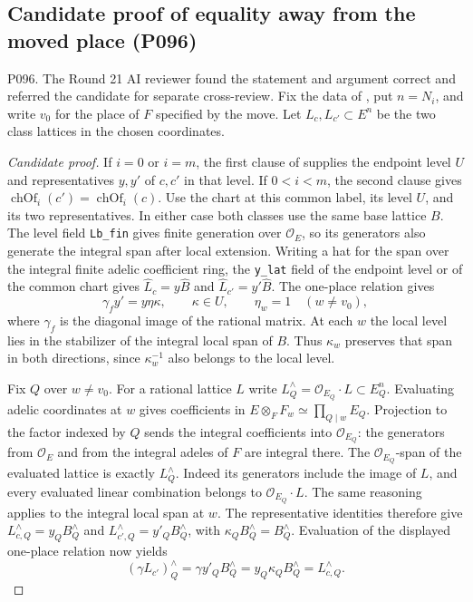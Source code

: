 \subsection{Candidate proof of equality away from the moved place (P096)}
\label{sec:pending-p096}
\noindent\textsf{P096. The Round 21 AI reviewer found the statement and argument correct and referred the candidate for separate cross-review.}
Fix the data of , put $n=N_i$, and write $v_0$ for the
place of $F$ specified by the move. Let $L_c,L_{c'}\subset E^n$ be
the two class lattices in the chosen coordinates.

\begin{proof}[Candidate proof]
If $i=0$ or $i=m$, the first clause of  supplies the
endpoint level $U$ and representatives $y,y'$ of $c,c'$ in that
level. If $0<i<m$, the second clause gives
$\operatorname{chOf}_i(c')=\operatorname{chOf}_i(c)$. Use the
chart at this common label, its level $U$, and its two representatives.
In either case both classes use the same base lattice $B$. The level
field \nolinkurl{Lb_fin} gives finite generation over $\mathcal O_E$,
so its generators also generate the integral span after local extension.
Writing a hat for the span over the integral finite adelic coefficient ring,
the \nolinkurl{y_lat} field of the endpoint level or of the common chart gives
$\widehat L_c=y\widehat B$ and $\widehat L_{c'}=y'\widehat B$.
The one-place relation gives
\[
    \gamma_f y'=y\eta\kappa,\qquad
    \kappa\in U,\qquad \eta_w=1\quad(w\ne v_0),
\]
where $\gamma_f$ is the diagonal image of the rational matrix.
At each $w$ the local level lies in the stabilizer of the integral
local span of $B$. Thus $\kappa_w$ preserves that span in both
directions, since $\kappa_w^{-1}$ also belongs to the local level.

Fix $Q$ over $w\ne v_0$. For a rational lattice $L$ write
$L_Q^\wedge=\mathcal O_{E_Q}\cdot L\subset E_Q^n$. Evaluating adelic
coordinates at $w$ gives coefficients in $E\otimes_F F_w\simeq\prod_{Q\mid w}E_Q$.
Projection to the factor indexed by $Q$ sends the integral coefficients
into $\mathcal O_{E_Q}$: the generators from $\mathcal O_E$ and from
the integral adeles of $F$ are integral there. The
$\mathcal O_{E_Q}$-span of the evaluated lattice is exactly
$L_Q^\wedge$. Indeed its generators include the image of $L$, and
every evaluated linear combination belongs to $\mathcal O_{E_Q}\cdot L$.
The same reasoning applies to the integral local span at $w$. The
representative identities therefore give
$L_{c,Q}^\wedge=y_QB_Q^\wedge$ and
$L_{c',Q}^\wedge=y'_QB_Q^\wedge$, with
$\kappa_Q B_Q^\wedge=B_Q^\wedge$. Evaluation of the displayed
one-place relation now yields
\[
  (\gamma L_{c'})_Q^\wedge
     =\gamma y'_Q B_Q^\wedge
     =y_Q\kappa_Q B_Q^\wedge
     =L_{c,Q}^\wedge .
\]


\end{proof}
